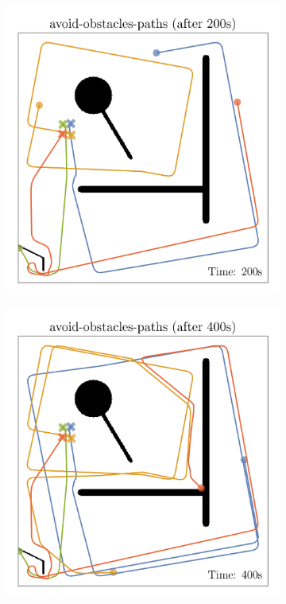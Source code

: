 \def\w{0.329\textwidth}
\begin{figure}[H]
    \centering
    \begin{subfigure}[b]{\w}
        \centering
        \includegraphics[width=\textwidth]{./figures/plots/paths/avoid-obstacles-paths-(after-200s).png}
    \end{subfigure}
    \begin{subfigure}[b]{\w}
        \centering
        \includegraphics[width=\textwidth]{./figures/plots/paths/avoid-obstacles-paths-(after-400s).png}

\end{subfigure}
\end{figure}

